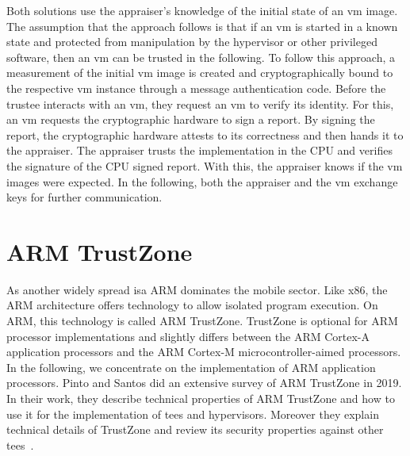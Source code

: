 Both solutions use the appraiser's knowledge of the initial state of an \gls{vm}
image. The assumption that the approach follows is that if an \gls{vm} is
started in a known state and protected from manipulation by the hypervisor or
other privileged software, then an \gls{vm} can be trusted in the following. To
follow this approach, a measurement of the initial \gls{vm} image is created and
cryptographically bound to the respective \gls{vm} instance through a message
authentication code. Before the trustee interacts with an \gls{vm}, they
request an \gls{vm} to verify its identity. For this, an \gls{vm} requests the
cryptographic hardware to sign a report. By signing the report, the
cryptographic hardware attests to its correctness and then hands it to the
appraiser. The appraiser trusts the implementation in the CPU and verifies the
signature of the CPU signed report. With this, the appraiser knows if the
\gls{vm} images were expected. In the following, both the appraiser and the
\gls{vm} exchange keys for further communication.\\

\section{ARM TrustZone}
\label{sec:20:trustzone}
As another widely spread \gls{isa} ARM dominates the mobile sector. Like x86,
the ARM architecture offers technology to allow isolated program execution. On
ARM, this technology is called ARM TrustZone. TrustZone is optional for ARM
processor implementations and slightly differs between the ARM Cortex-A
application processors and the ARM Cortex-M microcontroller-aimed processors. In
the following, we concentrate on the implementation of ARM application
processors. Pinto and Santos did an extensive survey of ARM TrustZone in 2019.
In their work, they describe technical properties of ARM TrustZone and how to
use it for the implementation of \glspl{tee} and hypervisors. Moreover they
explain technical details of TrustZone and review its security properties
against other \glspl{tee}~\cite{pinto_demystifying_2019}.\\

